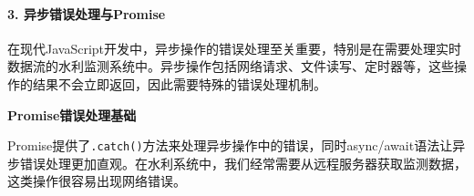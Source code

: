 \begin{Shaded}
\begin{Highlighting}[]
\NormalTok{    \} }\NormalTok{ \{}
\NormalTok{()}\OperatorTok{;}
            \NormalTok{(}\NormalTok{)}\OperatorTok{;}
            \NormalTok{(}\NormalTok{)}\OperatorTok{;}
\NormalTok{        \} }\NormalTok{ \{}
            \NormalTok{(}\OperatorTok{,}\NormalTok{)}\OperatorTok{;}
\NormalTok{        \}}
         \OperatorTok{;}
\NormalTok{    \}}
\NormalTok{\}}
\end{Highlighting}
\end{Shaded}

\paragraph{3. 异步错误处理与Promise}\label{ux5f02ux6b65ux9519ux8befux5904ux7406ux4e0epromise}

在现代JavaScript开发中，异步操作的错误处理至关重要，特别是在需要处理实时数据流的水利监测系统中。异步操作包括网络请求、文件读写、定时器等，这些操作的结果不会立即返回，因此需要特殊的错误处理机制。

\textbf{Promise错误处理基础}

Promise提供了\texttt{.catch()}方法来处理异步操作中的错误，同时async/await语法让异步错误处理更加直观。在水利系统中，我们经常需要从远程服务器获取监测数据，这类操作很容易出现网络错误。

